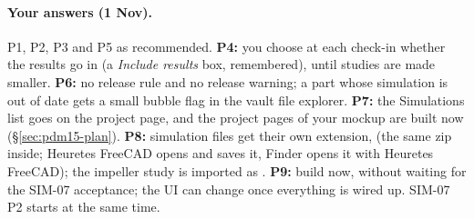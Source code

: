 \paragraph{Your answers (1 Nov).} P1, P2, P3 and P5 as recommended. \textbf{P4:} you choose at each check-in whether the
results go in (a \emph{Include results} box, remembered), until studies are made smaller. \textbf{P6:} no release
rule and no release warning; a part whose simulation is out of date gets a small bubble flag in the vault file
explorer. \textbf{P7:} the Simulations list goes on the project page, and the project pages of your mockup are built
now (\S\ref{sec:pdm15-plan}). \textbf{P8:} simulation files get their own extension,  (the same zip
inside; Heuretes FreeCAD opens and saves it, Finder opens it with Heuretes FreeCAD); the impeller study is imported as
. \textbf{P9:} build now, without waiting for the SIM-07 acceptance; the UI can change once
everything is wired up. SIM-07 P2 starts at the same time.
